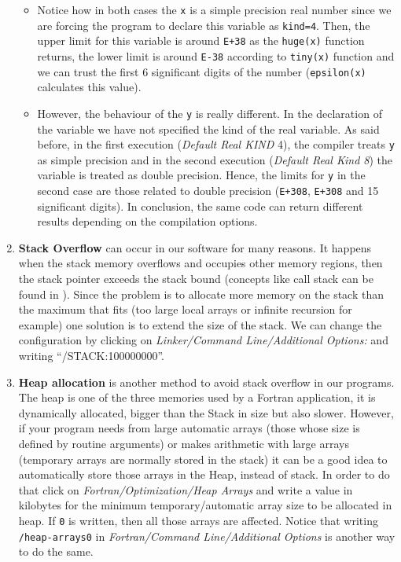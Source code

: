 \begin{enumerate}
\begin{IN}
    \begin{itemize}
\item Notice how in both cases the \verb|x| is a simple precision real number since we are forcing the program to declare this variable as \verb|kind=4|. Then, the upper limit for this variable is around \texttt{E+38} as the \verb|huge(x)| function returns, the lower limit is around \texttt{E-38} according to \verb|tiny(x)| function and we can trust the first 6 significant digits of the number (\verb|epsilon(x)| calculates this value). 

\item However, the behaviour of the \verb|y| is really different. In the declaration of the variable we have not specified the kind of the real variable. As said before, in the first execution (\textit{Default Real KIND} 4), the compiler treats \verb|y| as simple precision and in the second execution (\textit{Default Real Kind 8}) the variable is treated as double precision. Hence, the limits for \verb|y| in the second case are those related to double precision (\texttt{E+308}, \texttt{E+308} and 15 significant digits). In conclusion, the same code can return different results depending on the compilation options.
    \end{itemize}
\end{IN}   
    

    \item \textbf{Stack Overflow} can occur in our software for many reasons. It happens when the stack memory overflows and occupies other memory regions, then the stack pointer exceeds the stack bound \citep{stack} (concepts like call stack can be found in \citep{stack2}). Since the problem is to allocate more memory on the stack than the maximum that fits (too large local arrays or infinite recursion for example) one solution is to extend the size of the stack. We can change the configuration by clicking on \textit{Linker/Command Line/Additional Options:} and writing ``/STACK:100000000''.
    
    \item \textbf{Heap allocation} is another method to avoid stack overflow in our programs. The heap is one of the three memories used by a Fortran application, it is dynamically allocated, bigger than the Stack in size but also slower. However, if your program needs from large automatic arrays (those whose size is defined by routine arguments) or makes arithmetic with large arrays (temporary arrays are normally stored in the stack) it can be a good idea to automatically store those arrays in the Heap, instead of stack. In order to do that click on \textit{Fortran/Optimization/Heap Arrays} and write a value in kilobytes for the minimum temporary/automatic array size to be allocated in heap. If \texttt{0} is written, then all those arrays are affected. Notice that writing \texttt{/heap-arrays0} in \textit{Fortran/Command Line/Additional Options} is another way to do the same. 
    

\end{enumerate}
